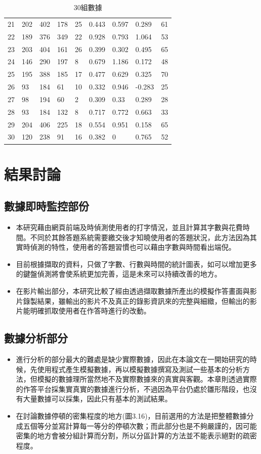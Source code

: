 \begin{table}[]
\begin{tabular}{lllllllll}
		21 & 202 & 402 & 178    & 25     & 0.443  & 0.597  & 0.289  & 61      \\
		22 & 189 & 376 & 349    & 22     & 0.928  & 0.793  & 1.064  & 53      \\
		23 & 203 & 404 & 161    & 26     & 0.399  & 0.302  & 0.495  & 65      \\
		24 & 146 & 290 & 197    & 8      & 0.679  & 1.186  & 0.172  & 48      \\
		25 & 195 & 388 & 185    & 17     & 0.477  & 0.629  & 0.325  & 70      \\
		26 & 93  & 184 & 61     & 10     & 0.332  & 0.946  & -0.283 & 25      \\
		27 & 98  & 194 & 60     & 2      & 0.309  & 0.33   & 0.289  & 28      \\
		28 & 93  & 184 & 132    & 8      & 0.717  & 0.772  & 0.663  & 33      \\
		29 & 204 & 406 & 225    & 18     & 0.554  & 0.951  & 0.158  & 65      \\
		30 & 120 & 238 & 91     & 16     & 0.382  & 0      & 0.765  & 52     
	\end{tabular}
\caption{30組數據}
\end{table}

\newpage
\section{結果討論}
\subsection{數據即時監控部份}
\begin{itemize}
	\item 本研究藉由網頁前端及時偵測使用者的打字情況，並且計算其字數與花費時間。不同於其餘答題系統需要繳交後才知曉使用者的答題狀況，此方法因為其實時偵測的特性，使用者的答題習慣也可以藉由字數與時間看出端倪。
	\item 目前根據擷取的資料，只做了字數、行數與時間的統計圖表，如可以增加更多的鍵盤偵測將會使系統更加完善，這是未來可以持續改善的地方。
	\item 在影片輸出部分，本研究比較了經由透過擷取數據所產出的模擬作答畫面與影片錄製結果，雖輸出的影片不及真正的錄影資訊來的完整與細緻，但輸出的影片能明確抓取使用者在作答時進行的改動。
\end{itemize}
\subsection{數據分析部分}
\begin{itemize}
	\item 進行分析的部分最大的難處是缺少實際數據，因此在本論文在一開始研究的時候，先使用程式產生模擬數據，再以模擬數據撰寫及測試一些基本的分析方法，但模擬的數據理所當然地不及實際數據來的真實與客觀。本章則透過實際的作答平台採集實真實的數據進行分析，不過因為平台仍處於雛形階段，也沒有大量數據可以採集，因此只有基本的測試結果。
	\item 在討論數據停頓的密集程度的地方(圖3.16)，目前選用的方法是把整體數據分成五個等分並寫計算每一等分的停頓次數；而此部分也是不夠嚴謹的，因可能密集的地方會被分組計算而分割，所以分區計算的方法並不能表示絕對的疏密程度。
\end{itemize}
